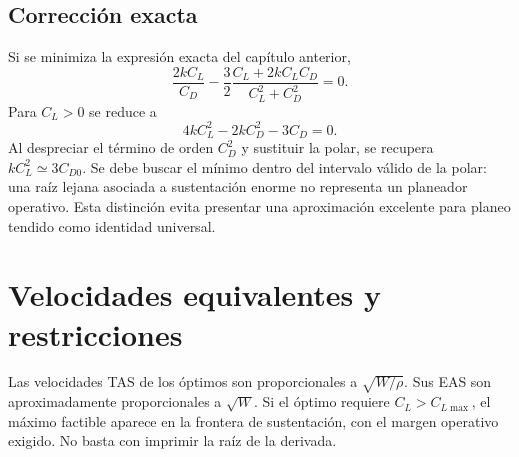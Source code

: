 \subsection{Corrección exacta}
Si se minimiza la expresión exacta del capítulo anterior,
\begin{equation}
\frac{2kC_L}{C_D}-\frac{3}{2}
\frac{C_L+2kC_LC_D}{C_L^2+C_D^2}=0.
\end{equation}
Para $C_L>0$ se reduce a
\begin{equation}
4kC_L^2-2kC_D^2-3C_D=0.
\label{eq:min-sink-exacto}
\end{equation}
Al despreciar el término de orden $C_D^2$ y sustituir la polar, se recupera $kC_L^2\simeq3C_{D0}$. Se debe buscar el mínimo dentro del intervalo válido de la polar: una raíz lejana asociada a sustentación enorme no representa un planeador operativo. Esta distinción evita presentar una aproximación excelente para planeo tendido como identidad universal.

\section{Velocidades equivalentes y restricciones}
Las velocidades TAS de los óptimos son proporcionales a $\sqrt{W/\rho}$. Sus EAS son aproximadamente proporcionales a $\sqrt W$. Si el óptimo requiere $C_L>C_{L\max}$, el máximo factible aparece en la frontera de sustentación, con el margen operativo exigido. No basta con imprimir la raíz de la derivada.



